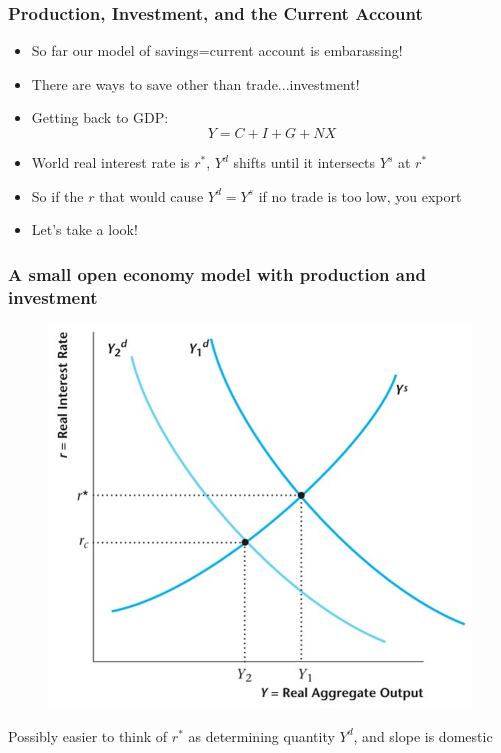 \documentclass{beamer}
\begin{document}
\begin{frame}
\frametitle[alignment=center]{Production, Investment, and the Current Account}
\begin{itemize}
\item So far our model of savings=current account is embarassing!
\bigskip
\item There are ways to save other than trade...investment!
\bigskip
\item Getting back to GDP:
$$Y=C+I+G+NX$$
\item World real interest rate is $r^*$, $Y^d$ shifts until it intersects $Y^s$ at $r^*$
\bigskip
\item So if the $r$ that would cause $Y^d=Y^s$ if no trade is too low, you export
\bigskip
\item Let's take a look!
\end{itemize}
\end{frame}

\begin{frame}
\frametitle[alignment=center]{A small open economy model with production and investment}
\begin{figure}
\centering
\includegraphics[scale=0.55]{Figures/W_Fig_16pt7.png}
\end{figure}
Possibly easier to think of $r^*$ as determining quantity $Y^d$, and slope is domestic
\end{frame}
\end{document}
